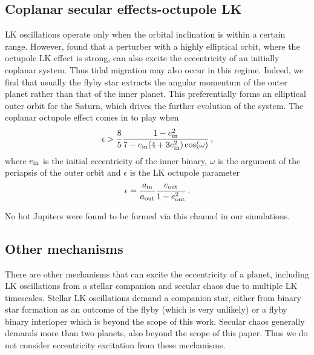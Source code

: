 \documentclass[twocolumn]{aastex63}
\begin{document}
\subsection{Coplanar secular effects-octupole LK}
LK oscillations operate only when the orbital inclination is within a certain range. However, \citet{Li2014} found that a perturber with a highly elliptical orbit, where the octupole LK effect is strong, can also excite the eccentricity of an initially coplanar system. Thus tidal migration may also occur in this regime. Indeed, we find that usually the flyby star extracts the angular momentum of the outer planet rather than that of the inner planet. This preferentially forms an elliptical outer orbit for the Saturn, which drives the further evolution of the system. The coplanar octupole effect comes in to play when
\begin{equation}\label{eq:oct}
    \epsilon > \frac{8}{5}\frac{1-e_{\rm in}^2}{7-e_{\rm in}(4+3e_{\rm in}^2)\cos(\omega)}\,,
\end{equation}
where $e_{\rm in}$ is the initial eccentricity of the inner binary, $\omega$ is the argument of the periapsis of the outer orbit and $\epsilon$ is the LK octupole parameter
\begin{equation}
\epsilon =\frac{a_{\rm in}}{a_{\rm out}}\frac{e_{\rm out}}{1-e_{\rm out}^2}\,.
\end{equation}

No hot Jupiters were found to be formed via this channel in our simulations.



\subsection{Other mechanisms}
There are other mechanisms that can excite the eccentricity of a planet, including LK oscillations from a stellar companion \citep{Naoz2012} and secular chaos due to multiple LK timescales. Stellar LK oscillations demand a companion star, either from binary star formation as an outcome of the flyby (which is very unlikely) or a flyby binary interloper which is beyond the scope of this work. Secular chaos generally demands more than two planets, also beyond the scope of this paper. Thus we do not consider eccentricity excitation from these mechanisms.
\end{document}
